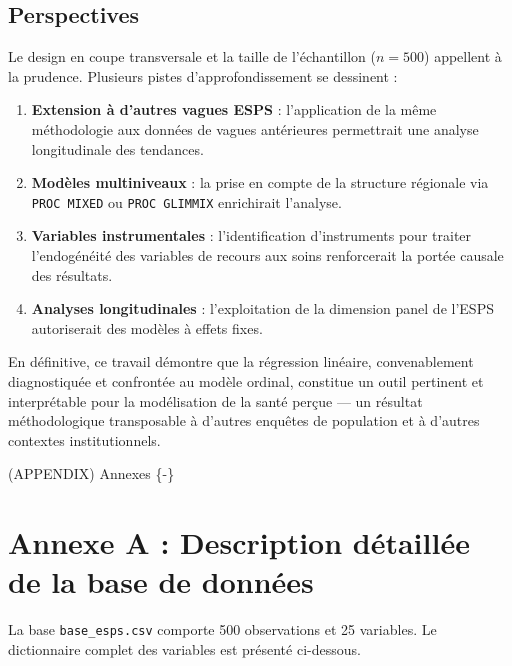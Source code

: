\documentclass[11pt,a4paper]{memoirerecherche}
\providecommand{\tightlist}{%
  \setlength{\itemsep}{0pt}\setlength{\parskip}{0pt}}
\begin{document}
\hypertarget{perspectives}{%
\subsection*{Perspectives}\label{perspectives}}

Le design en coupe transversale et la taille de l'échantillon (\(n = 500\)) appellent à la prudence. Plusieurs pistes d'approfondissement se dessinent :

\begin{enumerate}
\def\labelenumi{\arabic{enumi}.}
\tightlist
\item
  \textbf{Extension à d'autres vagues ESPS} : l'application de la même méthodologie aux données de vagues antérieures permettrait une analyse longitudinale des tendances.
\item
  \textbf{Modèles multiniveaux} : la prise en compte de la structure régionale via \texttt{PROC\ MIXED} ou \texttt{PROC\ GLIMMIX} enrichirait l'analyse.
\item
  \textbf{Variables instrumentales} : l'identification d'instruments pour traiter l'endogénéité des variables de recours aux soins renforcerait la portée causale des résultats.
\item
  \textbf{Analyses longitudinales} : l'exploitation de la dimension panel de l'ESPS autoriserait des modèles à effets fixes.
\end{enumerate}

En définitive, ce travail démontre que la régression linéaire, convenablement diagnostiquée et confrontée au modèle ordinal, constitue un outil pertinent et interprétable pour la modélisation de la santé perçue --- un résultat méthodologique transposable à d'autres enquêtes de population et à d'autres contextes institutionnels.

\newpage

(APPENDIX) Annexes \{-\}

\hypertarget{annexe-a-description-duxe9tailluxe9e-de-la-base-de-donnuxe9es}{%
\section*{Annexe A : Description détaillée de la base de données}\label{annexe-a-description-duxe9tailluxe9e-de-la-base-de-donnuxe9es}}

La base \texttt{base\_esps.csv} comporte 500 observations et 25 variables. Le dictionnaire complet des variables est présenté ci-dessous.
\end{document}
